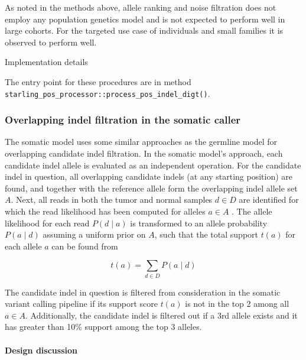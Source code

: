\documentclass{article}
\let\IncludeDevelopmentDetail
\newenvironment{raggedParagraph}[1]
{
    \begin{paragraph} {#1}
        \raggedright
    }
    {
    \end{paragraph}
}
\begin{document}
As noted in the methods above, allele ranking and noise filtration does not employ any population genetics model and is not expected to perform well in large cohorts. For the targeted use case of individuals and small families it is observed to perform well.

\begin{raggedParagraph}{Implementation details}

    The entry point for these procedures are in method \verb|starling_pos_processor::process_pos_indel_digt()|.

\end{raggedParagraph}

\fi %


\subsubsection{Overlapping indel filtration in the somatic caller}

The somatic model uses some similar approaches as the germline model for overlapping candidate indel filtration. In the somatic model's approach, each candidate indel allele is evaluated as an independent operation. For the candidate indel in question, all overlapping candidate indels (at any starting position) are found, and together with the reference allele form the overlapping indel allele set $A$. Next, all reads in both the tumor and normal samples $d \in D$ are identified for which the read likelihood has been computed for alleles $a \in A$ . The allele likelihood for each read $P(d \mid a)$ is transformed to an allele probability $P(a \mid d)$ assuming a uniform prior on $A$, such that the total support $t(a)$ for each allele $a$ can be found from

\begin{equation*}
\label{eq:perSomaticModelAlleleSupport}
t(a) = \sum_{d \in D}{P(a \mid d)}
\end{equation*}

The candidate indel in question is filtered from consideration in the somatic variant calling pipeline if its support score $t(a)$ is not in the top 2 among all $a \in A$. Additionally, the candidate indel is filtered out if a 3rd allele exists and it has greater than 10\% support among the top 3 alleles.

\ifx\IncludeDevelopmentDetail

\paragraph{Design discussion}
\end{document}
